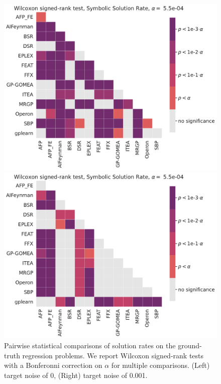 \begin{figure}
    \begin{minipage}{0.5\textwidth}
        \includegraphics[width=\textwidth]{figs/Pairwise_comparison_of_Symbolic_Solution_Rate_on_symbolic_problems_target_noise=0.0.pdf}
    \end{minipage}
    \begin{minipage}{0.5\textwidth}
        \includegraphics[width=\textwidth]{figs/Pairwise_comparison_of_Symbolic_Solution_Rate_on_symbolic_problems_target_noise=0.001.pdf}
    \end{minipage}
    \caption{ 
        Pairwise statistical comparisons of solution rates on the ground-truth regression problems. 
        We report Wilcoxon signed-rank tests with a Bonferonni correction on $\alpha$ for multiple comparisons.
        (Left) target noise of 0, (Right) target noise of 0.001. 
    }
    \label{fig:heat_stats_r2_sr}
\end{figure}

